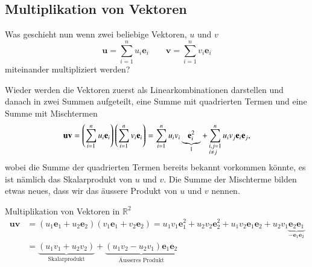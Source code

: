 \subsection{Multiplikation von Vektoren}
Was geschieht nun wenn zwei beliebige Vektoren, $u$ und $v$
\begin{equation}
    \textbf{u} = 
    \sum_{i=1}^{n} u_i \textbf{e}_i 
    \qquad 
    \textbf{v} = \sum_{i=1}^{n} v_i \textbf{e}_i
\end{equation}
 miteinander multipliziert werden? 
 
 Wieder werden die Vektoren zuerst als Linearkombinationen darstellen und danach in zwei Summen aufgeteilt, eine Summe mit quadrierten Termen und eine Summe mit Mischtermen
\begin{equation}
    \begin{split}
        \textbf{u}\textbf{v} 
        =
        \left ( 
        \sum_{i=1}^{n} u_i \textbf{e}_i
        \right ) 
        \left ( 
        \sum_{i=1}^{n} v_i \textbf{e}_i
        \right) 
        = 
        \sum_{i=1}^n u_iv_i\underbrace{\textbf{e}_i^2}_{1} 
        + \sum_{\begin{subarray}{l}i,j=1\\i \neq j\end{subarray}}^n  u_iv_j\textbf{e}_i\textbf{e}_j,
    \end{split}
\end{equation}
wobei die Summe der quadrierten Termen bereits bekannt vorkommen könnte, es ist nämlich das Skalarprodukt von $u$ und $v$. Die Summe der Mischterme bilden etwas neues, dass wir das äussere Produkt von $u$ und $v$ nennen.
\begin{beispiel}
    Multiplikation von Vektoren in $\mathbb{R}^2$
\begin{equation}
    \begin{split}
        \textbf{u}\textbf{v} 
        &= 
        (u_1\textbf{e}_1 + u_2\textbf{e}_2)(v_1\textbf{e}_1 + v_2\textbf{e}_2) 
        = 
        u_1v_1\textbf{e}_1^2
        + 
        u_2v_2\textbf{e}_2^2 
        + 
        u_1v_2\textbf{e}_1\textbf{e}_2 
        +  
        u_2v_1\underbrace{\textbf{e}_2\textbf{e}_1}_{-\textbf{e}_1\textbf{e}_2}
        \\\ 
        &=  
        \underbrace{(u_1v_1 + u_2v_2)}_{\text{Skalarprodukt}} 
        + 
        \underbrace{(u_1v_2 - u_2v_1)\textbf{e}_1\textbf{e}_2}_{\text{Äusseres Produkt}}
    \end{split}
\end{equation}
\end{beispiel}

